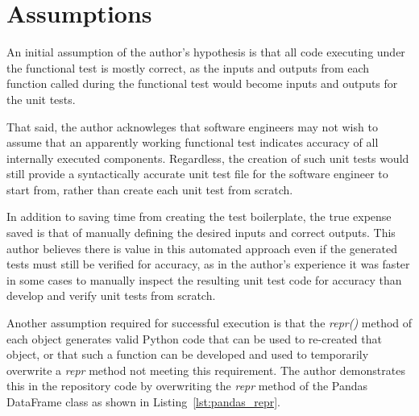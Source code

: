 \section{Assumptions}\label{sec:assumptions}

An initial assumption of the author's hypothesis is that all code executing under the
functional test is mostly correct, as the inputs and outputs from each
function called during the functional test would become inputs and outputs for the
unit tests.  

That said, the author acknowleges that software engineers may not 
wish to assume that an apparently working functional test indicates accuracy of 
all internally executed components. Regardless, the creation of such unit 
tests would still provide a syntactically accurate unit
test file for the software engineer to start from, rather than create each unit
test from scratch.  

In addition to saving time from creating the test
boilerplate, the true expense saved is that of manually defining the desired
inputs and correct outputs.  This author believes there is value in this automated
approach even if the generated tests must still be verified for accuracy,
as in the author's experience it was faster in some cases to manually inspect 
the resulting unit test code for accuracy than develop and verify unit tests from scratch.

Another assumption required for successful execution is that the \textit{repr()} method
of each object generates valid Python code that can be used to re-created that
object, or that such a function can be developed and used to temporarily
overwrite a \textit{repr\(\)} method not meeting this requirement.  The author demonstrates
this in the repository code by overwriting the \textit{repr\(\)} method of the
Pandas DataFrame class as shown in Listing~\ref{lst:pandas_repr}.

 
 
